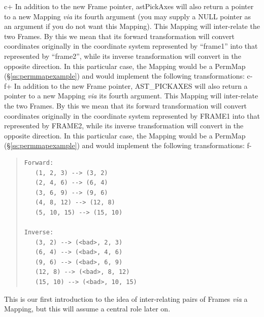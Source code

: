 \documentclass[twoside,11pt]{article}
\newcommand{\secref}[1]{\S\ref{#1}}
\newcommand{\secref}[1]{\ref{#1}}
\begin{document}
c+
In addition to the new Frame pointer, astPickAxes will also return a
pointer to a new Mapping {\em{via}} its fourth argument (you may supply a
NULL pointer as an argument if you do not want this Mapping).  This
Mapping will inter-relate the two Frames. By this we mean that its
forward transformation will convert coordinates originally in the
coordinate system represented by ``frame1'' into that represented by
``frame2'', while its inverse transformation will convert in the
opposite direction. In this particular case, the Mapping would be a
PermMap (\secref{ss:permmapexample}) and would implement the following
transformations:
c-
f+
In addition to the new Frame pointer, AST\_PICKAXES will also return a
pointer to a new Mapping {\em{via}} its fourth argument. This Mapping will
inter-relate the two Frames. By this we mean that its forward
transformation will convert coordinates originally in the coordinate
system represented by FRAME1 into that represented by FRAME2, while
its inverse transformation will convert in the opposite direction. In
this particular case, the Mapping would be a PermMap
(\secref{ss:permmapexample}) and would implement the following
transformations:
f-

\begin{quote}
\begin{verbatim}
Forward:
   (1, 2, 3) --> (3, 2)
   (2, 4, 6) --> (6, 4)
   (3, 6, 9) --> (9, 6)
   (4, 8, 12) --> (12, 8)
   (5, 10, 15) --> (15, 10)

Inverse:
   (3, 2) --> (<bad>, 2, 3)
   (6, 4) --> (<bad>, 4, 6)
   (9, 6) --> (<bad>, 6, 9)
   (12, 8) --> (<bad>, 8, 12)
   (15, 10) --> (<bad>, 10, 15)
\end{verbatim}
\end{quote}

This is our first introduction to the idea of inter-relating pairs of
Frames {\em{via}} a Mapping, but this will assume a central role later on.
\end{document}
